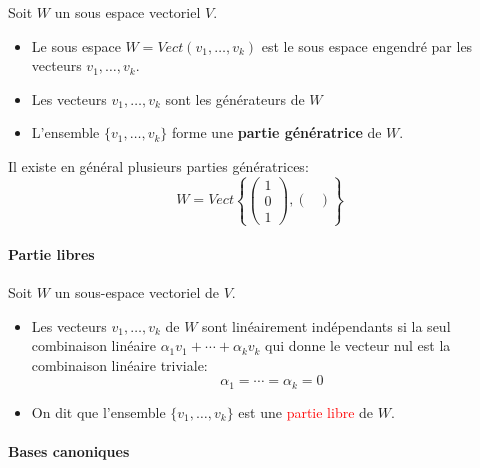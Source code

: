 

Soit $W$ un sous espace vectoriel $V$.
\begin{itemize}
    \item Le sous espace $W = Vect(v_1, \dots, v_k)$ est le sous espace engendré par les vecteurs $v_1, \dots, v_k$.
    \item Les vecteurs $v_1, \dots, v_k$ sont les générateurs de $W$
    \item L'ensemble $\{v_1, \dots, v_k\}$ forme une \textbf{partie génératrice} de $W$.
\end{itemize}
\begin{exemple}
    Il existe en général plusieurs parties génératrices:
    \[W = Vect\left\{\begin{pmatrix}
        1 \\ 0 \\ 1
    \end{pmatrix}, \begin{pmatrix}
        
    \end{pmatrix}\right\}\]
\end{exemple}
\paragraph{Partie libres}
Soit $W$ un sous-espace vectoriel de $V$.
\begin{itemize}
    \item Les vecteurs $v_1, \dots, v_k$ de $W$ sont linéairement indépendants si la seul combinaison linéaire $\alpha_1v_1 + \cdots + \alpha_kv_k$ qui donne le vecteur nul est la combinaison linéaire triviale:
    \[\alpha_1 = \cdots = \alpha_k = 0\]

    \item On dit que l'ensemble $\{v_1, \dots, v_k\}$ est une \textcolor{red}{partie libre} de $W$.
\end{itemize}


\paragraph{Bases canoniques}

